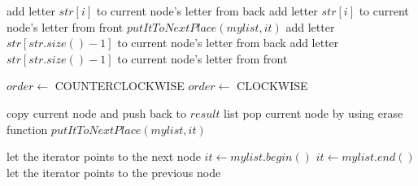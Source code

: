 \documentclass[12pt]{article}%
\begin{document}
\begin{algorithm}%
  \caption{callTheWord(list\textlangle Node\textrangle \&, list\textlangle Node\textrangle::iterator \&, string)}
  \begin{algorithmic}[1]
        \State add letter $str[i]$ to current node's letter from back
        \State add letter $str[i]$ to current node's letter from front
      \EndIf
      \State $putItToNextPlace(mylist, it)$
    \EndFor
      \State add letter $str[str.size()-1]$ to current node's letter from back
      \State add letter $str[str.size()-1]$ to current node's letter from front 
    \EndIf
  \end{algorithmic}
\end{algorithm}%
\begin{algorithm}%
  \caption{changeOrderIfNeed(string)}
  \begin{algorithmic}[1]
      \State $order\gets$ COUNTERCLOCKWISE
    \Else
      \State $order\gets$ CLOCKWISE
    \EndIf
  \end{algorithmic}
\end{algorithm}%
\begin{algorithm}%
  \caption{oneOutFromGame(list\textlangle Node\textrangle \&, list\textlangle Node\textrangle \&, list\textlangle Node\textrangle ::iterator \&)}
  \begin{algorithmic}[1]
    \State copy current node and push back to $result$ list
    \State pop current node by using erase function
    \State $putItToNextPlace(mylist, it)$ 
  \end{algorithmic}
\end{algorithm}%
\begin{algorithm}%
  \caption{putItToNextPlace(list\textlangle Node\textrangle \&, list\textlangle Node\textrangle::iterator \&)}
  \begin{algorithmic}[1]
      \State let the iterator points to the next node
        \State $it\gets mylist.begin()$
      \EndIf
        \State $it\gets mylist.end()$
      \EndIf
      \State let the iterator points to the previous node
    \EndIf
  \end{algorithmic}
\end{algorithm}%
\end{document}
